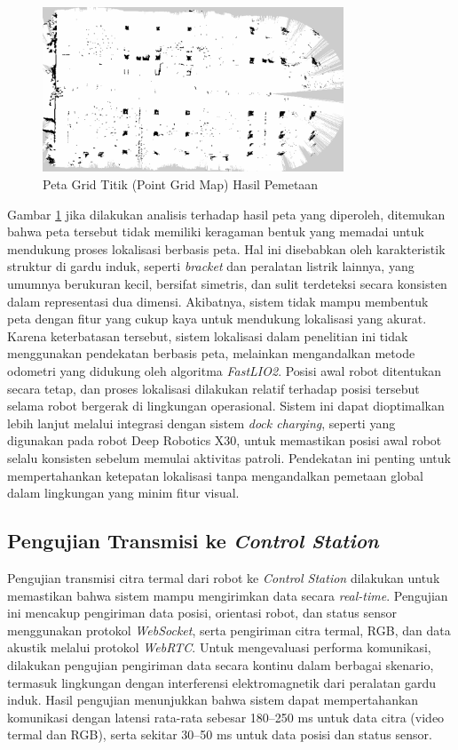 \begin{figure}[H]
\centering
\includegraphics[width=0.8\textwidth]{gambar/bab4/pgm_gitet.png}
\caption{Peta Grid Titik (Point Grid Map) Hasil Pemetaan}
\label{fig:point_grid_map}
\end{figure}

Gambar \ref{fig:point_grid_map} jika dilakukan analisis terhadap hasil peta yang diperoleh, ditemukan bahwa peta tersebut tidak memiliki keragaman bentuk yang memadai untuk mendukung proses lokalisasi berbasis peta. Hal ini disebabkan oleh karakteristik struktur di gardu induk, seperti \textit{bracket} dan peralatan listrik lainnya, yang umumnya berukuran kecil, bersifat simetris, dan sulit terdeteksi secara konsisten dalam representasi dua dimensi. Akibatnya, sistem tidak mampu membentuk peta dengan fitur yang cukup kaya untuk mendukung lokalisasi yang akurat. Karena keterbatasan tersebut, sistem lokalisasi dalam penelitian ini tidak menggunakan pendekatan berbasis peta, melainkan mengandalkan metode odometri yang didukung oleh algoritma \textit{FastLIO2}. Posisi awal robot ditentukan secara tetap, dan proses lokalisasi dilakukan relatif terhadap posisi tersebut selama robot bergerak di lingkungan operasional. Sistem ini dapat dioptimalkan lebih lanjut melalui integrasi dengan sistem \textit{dock charging}, seperti yang digunakan pada robot Deep Robotics X30, untuk memastikan posisi awal robot selalu konsisten sebelum memulai aktivitas patroli. Pendekatan ini penting untuk mempertahankan ketepatan lokalisasi tanpa mengandalkan pemetaan global dalam lingkungan yang minim fitur visual.



\subsection{Pengujian Transmisi ke \emph{Control Station}}
Pengujian transmisi citra termal dari robot ke \emph{Control Station} dilakukan untuk memastikan bahwa sistem mampu mengirimkan data secara \emph{real-time}. Pengujian ini mencakup pengiriman data posisi, orientasi robot, dan status sensor menggunakan protokol \emph{WebSocket}, serta pengiriman citra termal, RGB, dan data akustik melalui protokol \emph{WebRTC}. Untuk mengevaluasi performa komunikasi, dilakukan pengujian pengiriman data secara kontinu dalam berbagai skenario, termasuk lingkungan dengan interferensi elektromagnetik dari peralatan gardu induk. Hasil pengujian menunjukkan bahwa sistem dapat mempertahankan komunikasi dengan latensi rata-rata sebesar 180–250 ms untuk data citra (video termal dan RGB), serta sekitar 30–50 ms untuk data posisi dan status sensor.

